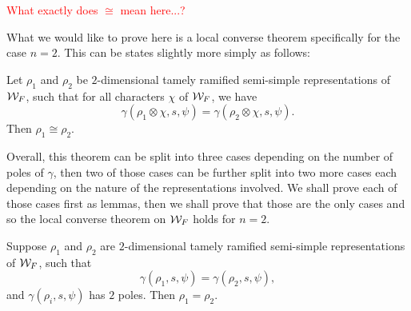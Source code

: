 \textcolor{red}{What exactly does $\cong$ mean here...?}

What we would like to prove here is a local converse theorem specifically for the case $n=2$. This can be states slightly more simply as follows:

\begin{theorem}[Local Converse Theorem on $\cW_F$ with $n=2$]
  \label{thm:LCTn=2}
  Let $\rho_1$ and $\rho_2$ be $2$-dimensional tamely ramified semi-simple representations of $\cW_F$, such that for all characters $\chi$ of  $\cW_F$, we have
  \[\gamma(\rho_1 \otimes \chi,s,\psi) = \gamma(\rho_2 \otimes \chi,s,\psi).\]
  Then $\rho_1 \cong \rho_2$.
\end{theorem}

Overall, this theorem can be split into three cases depending on the number of poles of $\gamma$, then two of those cases can be further split into two more cases each depending on the nature of the representations involved. We shall prove each of those cases first as lemmas, then we shall prove that those are the only cases and so the local converse theorem on $\cW_F$ holds for $n=2$.


\begin{lemma}
  \label{lem:gamma-two-poles}
  Suppose $\rho_1$ and $\rho_2$ are $2$-dimensional tamely ramified semi-simple representations of $\cW_F$, such that
  \[\gamma(\rho_1,s,\psi) = \gamma(\rho_2,s,\psi),\]
  and $\gamma(\rho_i,s,\psi)$ has $2$ poles.
  Then $\rho_1 = \rho_2$.
\end{lemma}

